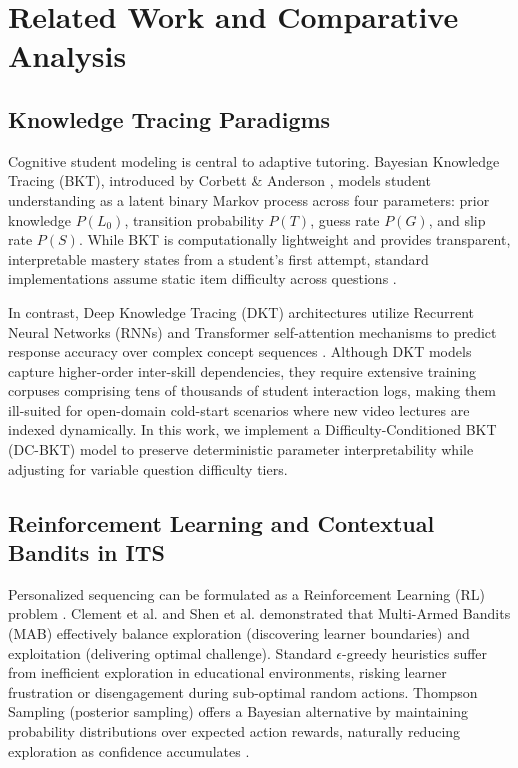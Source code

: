 \documentclass[journal]{IEEEtran}
\begin{document}
%
%
\section{Related Work and Comparative Analysis}

\subsection{Knowledge Tracing Paradigms}
Cognitive student modeling is central to adaptive tutoring. Bayesian Knowledge Tracing (BKT), introduced by Corbett \& Anderson \cite{corbett1994knowledge}, models student understanding as a latent binary Markov process across four parameters: prior knowledge $P(L_0)$, transition probability $P(T)$, guess rate $P(G)$, and slip rate $P(S)$. While BKT is computationally lightweight and provides transparent, interpretable mastery states from a student's first attempt, standard implementations assume static item difficulty across questions \cite{baker2008more, yudelson2013individualized}.

In contrast, Deep Knowledge Tracing (DKT) architectures utilize Recurrent Neural Networks (RNNs) and Transformer self-attention mechanisms to predict response accuracy over complex concept sequences \cite{piech2015deep}. Although DKT models capture higher-order inter-skill dependencies, they require extensive training corpuses comprising tens of thousands of student interaction logs, making them ill-suited for open-domain cold-start scenarios where new video lectures are indexed dynamically. In this work, we implement a Difficulty-Conditioned BKT (DC-BKT) model to preserve deterministic parameter interpretability while adjusting for variable question difficulty tiers.

\subsection{Reinforcement Learning and Contextual Bandits in ITS}
Personalized sequencing can be formulated as a Reinforcement Learning (RL) problem \cite{doroudi2019where, mandel2014offline}. Clement et al. \cite{clement2015multi} and Shen et al. \cite{shen2022contextual} demonstrated that Multi-Armed Bandits (MAB) effectively balance exploration (discovering learner boundaries) and exploitation (delivering optimal challenge). Standard $\epsilon$-greedy heuristics suffer from inefficient exploration in educational environments, risking learner frustration or disengagement during sub-optimal random actions. Thompson Sampling (posterior sampling) offers a Bayesian alternative by maintaining probability distributions over expected action rewards, naturally reducing exploration as confidence accumulates \cite{agrawal2012analysis, chapelle2011empirical, clement2015multi}.
\end{document}
